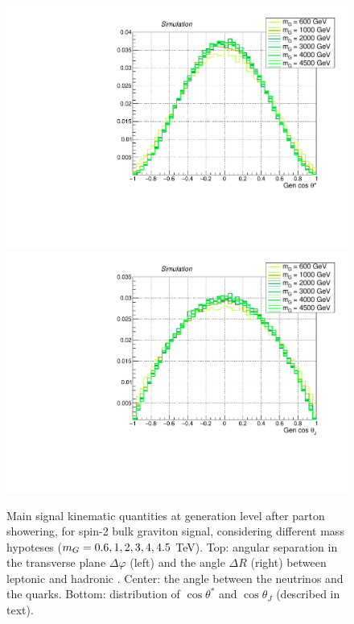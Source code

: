 \begin{figure}[!htb]
\begin{center}
     \includegraphics[width=.495\textwidth]{Gen_v9/XZZInv_g_CosThetaStar.pdf}%
     \includegraphics[width=.495\textwidth]{Gen_v9/XZZInv_g_CosThetaJ.pdf}%
   \end{center}
   \caption{Main signal kinematic quantities at generation level after parton showering, for spin-2 bulk graviton signal, considering different mass hypoteses ($m_{G} = 0.6, 1, 2, 3, 4, 4.5$ TeV). Top: angular separation in the transverse plane $\Delta \varphi$ (left) and the angle $\Delta R$ (right) between leptonic \Z and hadronic \Z. Center: the angle between the neutrinos and the quarks. Bottom: distribution of $\cos{\theta}^{*}$ and $\cos{\theta}_{J}$ (described in text).}
   \label{fig:genGravSignal3}
 \end{figure}

